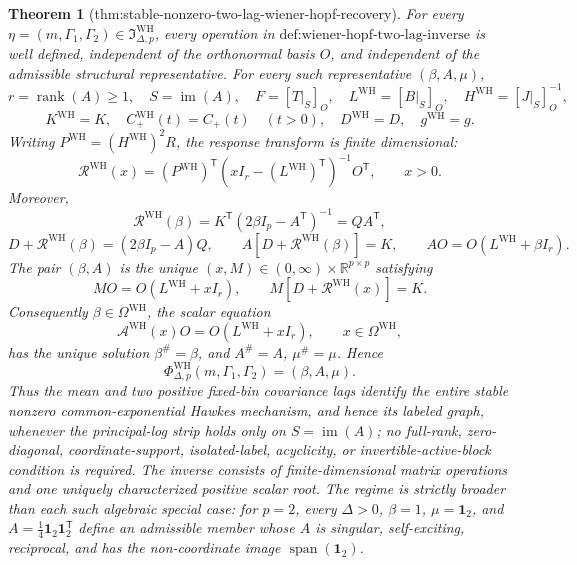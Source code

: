 \documentclass{article}
\newtheorem{theorem}{Theorem}
\begin{document}
\begin{theorem}[thm:stable-nonzero-two-lag-wiener-hopf-recovery]\label{thm:stable-nonzero-two-lag-wiener-hopf-recovery}
For every \(\eta=(m,\Gamma_1,\Gamma_2)\in\mathfrak I_{\Delta,p}^{\mathrm{WH}}\), every operation in \(\text{def:wiener-hopf-two-lag-inverse}\) is well defined, independent of the orthonormal basis \(O\), and independent of the admissible structural representative.  For every such representative \((\beta,A,\mu)\),
\[
 r=\operatorname{rank}(A)\geq1,\quad S=\operatorname{im}(A),\quad
 F=[T|_S]_O,\quad L^{\mathrm{WH}}=[B|_S]_O,\quad
 H^{\mathrm{WH}}=[J|_S]_O^{-1},
\]
\[
 K^{\mathrm{WH}}=K,\quad C_{+}^{\mathrm{WH}}(t)=C_{+}(t)\quad(t>0),\quad
 D^{\mathrm{WH}}=D,\quad g^{\mathrm{WH}}=g.
\]
Writing \(P^{\mathrm{WH}}=(H^{\mathrm{WH}})^2R\), the response transform is finite dimensional:
\[
 \mathcal R^{\mathrm{WH}}(x)
 =(P^{\mathrm{WH}})^{\mathsf T}(xI_r-(L^{\mathrm{WH}})^{\mathsf T})^{-1}O^{\mathsf T},
 \qquad x>0.
\]
Moreover,
\[
 \mathcal R^{\mathrm{WH}}(\beta)
 =K^{\mathsf T}(2\beta I_p-A^{\mathsf T})^{-1}=QA^{\mathsf T},
\]
\[
 D+\mathcal R^{\mathrm{WH}}(\beta)=(2\beta I_p-A)Q,
 \qquad A[D+\mathcal R^{\mathrm{WH}}(\beta)]=K,
 \qquad AO=O(L^{\mathrm{WH}}+\beta I_r).
\]
The pair \((\beta,A)\) is the unique \((x,M)\in(0,\infty)\times\mathbb R^{p\times p}\) satisfying
\[
 MO=O(L^{\mathrm{WH}}+xI_r),\qquad
 M[D+\mathcal R^{\mathrm{WH}}(x)]=K.
\]
Consequently \(\beta\in\Omega^{\mathrm{WH}}\), the scalar equation
\[
 \mathcal A^{\mathrm{WH}}(x)O=O(L^{\mathrm{WH}}+xI_r),\qquad x\in\Omega^{\mathrm{WH}},
\]
has the unique solution \(\beta^{\#}=\beta\), and \(A^{\#}=A\), \(\mu^{\#}=\mu\).  Hence
\[
 \Phi_{\Delta,p}^{\mathrm{WH}}(m,\Gamma_1,\Gamma_2)=(\beta,A,\mu).
\]
Thus the mean and two positive fixed-bin covariance lags identify the entire stable nonzero common-exponential Hawkes mechanism, and hence its labeled graph, whenever the principal-log strip holds only on \(S=\operatorname{im}(A)\); no full-rank, zero-diagonal, coordinate-support, isolated-label, acyclicity, or invertible-active-block condition is required.  The inverse consists of finite-dimensional matrix operations and one uniquely characterized positive scalar root.  The regime is strictly broader than each such algebraic special case: for \(p=2\), every \(\Delta>0\), \(\beta=1\), \(\mu=\mathbf 1_2\), and \(A=\tfrac14\mathbf 1_2\mathbf 1_2^{\mathsf T}\) define an admissible member whose \(A\) is singular, self-exciting, reciprocal, and has the non-coordinate image \(\operatorname{span}(\mathbf 1_2)\).
\end{theorem}
\end{document}
